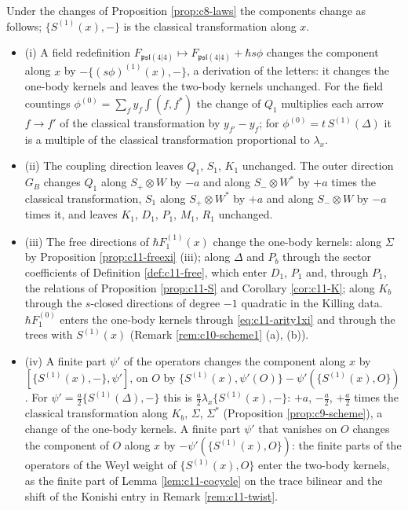 \begin{proposition}
\label{prop:c11-freedom}
Under the changes of Proposition \ref{prop:c8-laws} the components change as follows; $\{S^{(1)}(x),-\}$ is the classical transformation along $x$.
\begin{itemize}
\item (i) A field redefinition $F_{\mathfrak{psl}(4|4)}\mapsto F_{\mathfrak{psl}(4|4)}+\hbar s\phi$ changes the component along $x$ by $-\{(s\phi)^{(1)}(x),-\}$, a derivation of the letters: it changes the one-body kernels and leaves the two-body kernels unchanged. For the field countings $\phi^{(0)}=\sum_fy_f\int(f,f^*)$ the change of $Q_1$ multiplies each arrow $f\to f'$ of the classical transformation by $y_{f'}-y_f$; for $\phi^{(0)}=t\,S^{(1)}(\Delta)$ it is a multiple of the classical transformation proportional to $\lambda_x$.
\item (ii) The coupling direction leaves $Q_1$, $S_1$, $K_1$ unchanged. The outer direction $G_B$ changes $Q_1$ along $S_+\otimes W$ by $-a$ and along $S_-\otimes W^*$ by $+a$ times the classical transformation, $S_1$ along $S_+\otimes W^*$ by $+a$ and along $S_-\otimes W$ by $-a$ times it, and leaves $K_1$, $D_1$, $P_1$, $M_1$, $R_1$ unchanged.
\item (iii) The free directions of $\hbar F_1^{(1)}(x)$ change the one-body kernels: along $\Sigma$ by Proposition \ref{prop:c11-freexi} (iii); along $\Delta$ and $P_b$ through the sector coefficients of Definition \ref{def:c11-free}, which enter $D_1$, $P_1$ and, through $P_1$, the relations of Proposition \ref{prop:c11-S} and Corollary \ref{cor:c11-K}; along $K_b$ through the $s$-closed directions of degree $-1$ quadratic in the Killing data. $\hbar F_1^{(0)}$ enters the one-body kernels through \eqref{eq:c11-arity1xi} and through the trees with $S^{(1)}(x)$ (Remark \ref{rem:c10-scheme1} (a), (b)).
\item (iv) A finite part $\psi'$ of the operators changes the component along $x$ by $[\{S^{(1)}(x),-\},\psi']$, on $O$ by $\{S^{(1)}(x),\psi'(O)\}-\psi'(\{S^{(1)}(x),O\})$. For $\psi'=\tfrac a2\{S^{(1)}(\Delta),-\}$ this is $\tfrac a2\lambda_x\{S^{(1)}(x),-\}$: $+a$, $-\tfrac a2$, $+\tfrac a2$ times the classical transformation along $K_b$, $\Sigma$, $\Sigma^*$ (Proposition \ref{prop:c9-scheme}), a change of the one-body kernels. A finite part $\psi'$ that vanishes on $O$ changes the component of $O$ along $x$ by $-\psi'(\{S^{(1)}(x),O\})$: the finite parts of the operators of the Weyl weight of $\{S^{(1)}(x),O\}$ enter the two-body kernels, as the finite part of Lemma \ref{lem:c11-cocycle} on the trace bilinear and the shift of the Konishi entry in Remark \ref{rem:c11-twist}.

\end{itemize}
\end{proposition}
